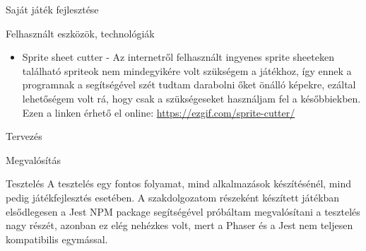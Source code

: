 \begin{MyChapter}{Saját játék fejlesztése}
\begin{MySection}{Felhasznált eszközök, technológiák}
\begin{itemize}
			\item Sprite sheet cutter - Az internetről felhasznált ingyenes sprite sheeteken található spriteok nem mindegyikére volt szükségem a játékhoz, így ennek a programnak a segítségével szét tudtam darabolni őket önálló képekre, ezáltal lehetőségem volt rá, hogy csak a szükségeseket használjam fel a későbbiekben. Ezen a linken érhető el online: \url{https://ezgif.com/sprite-cutter/}
			
		\end{itemize}
	
	\end{MySection}
		
	\begin{MySection}{Tervezés}
	\end{MySection}
		
	\begin{MySection}{Megvalósítás}
	\end{MySection}
		
	\begin{MySection}{Tesztelés}
		A tesztelés egy fontos folyamat, mind alkalmazások készítésénél, mind pedig játékfejlesztés esetében. 
		A szakdolgozatom részeként készített játékban elsődlegesen a Jest NPM package segítségével próbáltam megvalósítani a tesztelés nagy részét, azonban ez elég nehézkes volt, mert a Phaser és a Jest nem teljesen kompatibilis egymással.
				

\end{MySection}
\end{MyChapter}
